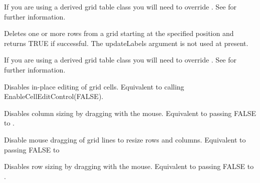 If you are using a derived grid table class you will need to override 
. See 
 for further information.

\label{wxgriddeleterows}


Deletes one or more rows from a grid starting at the specified position and returns
TRUE if successful. The updateLabels argument is not used at present.

If you are using a derived grid table class you will need to override 
. See 
 for further information.

\label{wxgriddisablecelleditcontrol}


Disables in-place editing of grid cells. 
Equivalent to calling EnableCellEditControl(FALSE).

\label{wxgriddisabledragcolsize}


Disables column sizing by dragging with the mouse. Equivalent to passing FALSE to 
. 

\label{wxgriddisabledraggridsize}


Disable mouse dragging of grid lines to resize rows and columns. Equivalent to passing
FALSE to 

\label{wxgriddisabledragrowsize}


Disables row sizing by dragging with the mouse. Equivalent to passing FALSE to 
. 

\label{wxgridenablecelleditcontrol}



